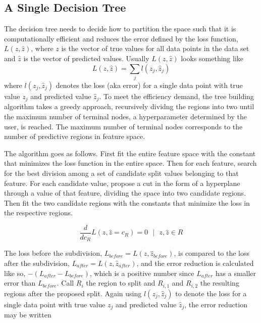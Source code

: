 \documentclass[12pt]{article}
\begin{document}
\subsection{A Single Decision Tree}

The decision tree needs to decide how to partition the space such that it is computationally efficient and reduces the error defined by the loss function, $L(z,\hat{z})$, where $z$ is the vector of true values for all data points in the data set and $\hat{z}$ is the vector of predicted values. Usually $L(z,\hat{z})$ looks something like 
\begin{equation}
L(z,\hat{z}) = \sum_{j} l(z_j,\hat{z}_j)
\end{equation}
where $l(z_j,\hat{z}_j)$ denotes the loss (aka error) for a single data point with true value $z_j$ and predicted value $\hat{z}_j$. To meet the efficiency demand, the tree building algorithm takes a greedy approach, recursively dividng the regions into two until the maximum number of terminal nodes, a hyperparameter determined by the user, is reached. The maximum number of terminal nodes corresponds to the number of predictive regions in feature space. 

The algorithm goes as follows. First fit the entire feature space with the constant that minimizes the loss function in the entire space. Then for each feature, search for the best division among a set of candidate split values belonging to that feature. For each candidate value, propose a cut in the form of a hyperplane through a value of that feature, dividing the space into two candidate regions. Then fit the two candidate regions with the constants that minimize the loss in the respective regions. 

\begin{equation}
\frac{d}{dc_{R}} L(z,\hat{z} = c_{R}) = 0 \textrm{ $|$ } z,\hat{z} \in R
\end{equation}

The loss before the subdivision, $L_{before} = L(z,\hat{z}_{before})$, is compared to the loss after the subdivision, $L_{after} = L(z,\hat{z}_{after})$, and the error reduction is calculated like so, $-(L_{after} - L_{before})$, which is a positive number since $L_{after}$ has a smaller error than $L_{before}$. Call $R_{i}$ the region to split and $R_{i,1}$ and $R_{i,2}$ the resulting regions after the proposed split. Again using $l(z_j,\hat{z}_j)$ to denote the loss for a single data point with true value $z_j$ and predicted value $\hat{z}_j$, the error reduction may be written 
\end{document}
